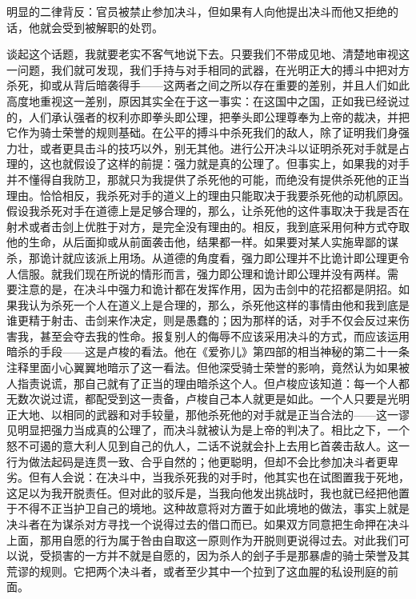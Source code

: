 \documentclass[12pt,oneside]{book}
\begin{document}
明显的二律背反：官员被禁止参加决斗，但如果有人向他提出决斗而他又拒绝的话，他就会受到被解职的处罚。 

谈起这个话题，我就要老实不客气地说下去。只要我们不带成见地、清楚地审视这一问题，我们就可发现，我们手持与对手相同的武器，在光明正大的搏斗中把对方杀死，抑或从背后暗袭得手——这两者之间之所以存在重要的差别，并且人们如此高度地重视这一差别，原因其实全在于这一事实：在这国中之国，正如我已经说过的，人们承认强者的权利亦即拳头即公理，把拳头即公理尊奉为上帝的裁决，并把它作为骑士荣誉的规则基础。在公平的搏斗中杀死我们的敌人，除了证明我们身强力壮，或者更具击斗的技巧以外，别无其他。进行公开决斗以证明杀死对手就是占理的，这也就假设了这样的前提：强力就是真的公理了。但事实上，如果我的对手并不懂得自我防卫，那就只为我提供了杀死他的可能，而绝没有提供杀死他的正当理由。恰恰相反，我杀死对手的道义上的理由只能取决于我要杀死他的动机原因。假设我杀死对手在道德上是足够合理的，那么，让杀死他的这件事取决于我是否在射术或者击剑上优胜于对方，是完全没有理由的。相反，我到底采用何种方式夺取他的生命，从后面抑或从前面袭击他，结果都一样。如果要对某人实施卑鄙的谋杀，那诡计就应该派上用场。从道德的角度看，强力即公理并不比诡计即公理更令人信服。就我们现在所说的情形而言，强力即公理和诡计即公理并没有两样。需
要注意的是，在决斗中强力和诡计都在发挥作用，因为击剑中的花招都是阴招。如果我认为杀死一个人在道义上是合理的，那么，杀死他这样的事情由他和我到底是谁更精于射击、击剑来作决定，则是愚蠢的；因为那样的话，对手不仅会反过来伤害我，甚至会夺去我的性命。报复别人的侮辱不应该采用决斗的方式，而应该运用暗杀的手段——这是卢梭的看法。他在《爱弥儿》第四部的相当神秘的第二十一条注释里面小心翼翼地暗示了这一看法。但他深受骑士荣誉的影响，竟然认为如果被人指责说谎，那自己就有了正当的理由暗杀这个人。但卢梭应该知道：每一个人都无数次说过谎，都配受到这一责备，卢梭自己本人就更是如此。一个人只要是光明正大地、以相同的武器和对手较量，那他杀死他的对手就是正当合法的——这一谬见明显把强力当成真的公理了，而决斗就被认为是上帝的判决了。相比之下，一个怒不可遏的意大利人见到自己的仇人，二话不说就会扑上去用匕首袭击敌人。这一行为做法起码是连贯一致、合乎自然的；他更聪明，但却不会比参加决斗者更卑劣。但有人会说：在决斗中，当我杀死我的对手时，他其实也在试图置我于死地，这足以为我开脱责任。但对此的驳斥是，当我向他发出挑战时，我也就已经把他置于不得不正当护卫自己的境地。这种故意将对方置于如此境地的做法，事实上就是
决斗者在为谋杀对方寻找一个说得过去的借口而已。如果双方同意把生命押在决斗上面，那用自愿的行为属于咎由自取这一原则作为开脱则更说得过去。对此我们可以说，受损害的一方并不就是自愿的，因为杀人的刽子手是那暴虐的骑士荣誉及其荒谬的规则。它把两个决斗者，或者至少其中一个拉到了这血腥的私设刑庭的前面。
\end{document}
